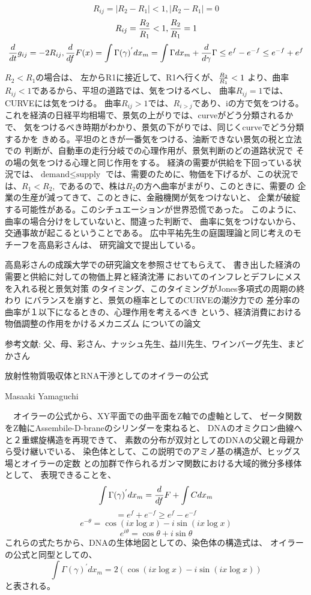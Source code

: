 \documentclass{jsarticle}
\begin{document}
{  $$ R_{ij} = |R_2 - R_1| < 1, |R_2 - R_1| = 0 $$
  $$ R_{ij} = {R_2 \over R_1} < 1, {R_2 \over R_1} = 1 $$
  $$ {d \over dt}g_{ij} = - 2 R_{ij}, {d \over d f} F(x) = 
  \int \Gamma(\gamma)^{'}dx_m = \int \Gamma dx_m + {d \over d \gamma}
  \Gamma \le e^{f} - e^{-f} \le e^{-f} + e^{f} $$

$ R_2 < R_1 \text{の場合は、}$
左からR1に接近して、R1へ行くが、${R_2 \over R_1} < 1 $
より、曲率$R_{ij} < 1$であるから、平坦の道路では、気をつけるべし、
曲率$R_{ij} = 1$では、CURVEには気をつける。
曲率$R_{ij} > 1$では、$R_{i > j}$であり、iの方で気をつける。
これを経済の日経平均相場で、景気の上がりでは、curveがどう分類されるかで、
気をつけるべき時期がわかり、景気の下がりでは、同じくcurveでどう分類するかを
きめる。平坦のときが一番気をつける、油断できない景気の税と立法での
判断が、自動車の走行分岐での心理作用が、景気判断のどの道路状況で
その場の気をつける心理と同じ作用をする。
経済の需要が供給を下回っている状況では、$\text{demand} \le \text{supply}$
では、需要のために、物価を下げるが、この状況では、$ R_1 < R_2, $
であるので、株は$R_2$の方へ曲率がまがり、このときに、需要の
企業の生産が減ってきて、このときに、金融機関が気をつけないと、
企業が破綻する可能性がある。このシチュエーションが世界恐慌であった。
このように、曲率の場合分けをしていないと、間違った判断で、
曲率に気をつけないから、交通事故が起こるということである。
広中平祐先生の庭園理論と同じ考えのモチーフを高島彩さんは、
研究論文で提出している。

   高島彩さんの成蹊大学での研究論文を参照させてもらえて、
書き出した経済の需要と供給に対しての物価上昇と経済沈滞
においてのインフレとデフレにメスを入れる税と景気対策
のタイミング、このタイミングがJones多項式の周期の終わり
にバランスを崩すと、景気の極率としてのCURVEの潮汐力での
差分率の曲率が１以下になるときの、心理作用を考えるべき
という、経済消費における物価調整の作用をかけるメカニズム
についての論文 　

参考文献: 父、母、彩さん、ナッシュ先生、益川先生、ワインバーグ先生、まどかさん


\newpage
\begin{center}
\large	放射性物質吸収体とRNA干渉としてのオイラーの公式
\end{center}
\begin{center}
	Masaaki Yamaguchi
\end{center}

  　オイラーの公式から、XY平面での曲平面をZ軸での虚軸として、
  ゼータ関数をZ軸にAssembile-D-braneのシリンダーを束ねると、
  DNAのオミクロン曲線へと２重螺旋構造を再現できて、
  素数の分布が双対としてのDNAの父親と母親から受け継いでいる、
  染色体として、この説明でのアミノ基の構造が、ヒッグス場とオイラーの定数
  との加群で作られるガンマ関数における大域的微分多様体として、
  表現できることを、
  $$ \int \Gamma(\gamma)^{'}dx_m = {d \over df}F + \int C dx_m $$
  $$ = e^f + e^{-f} \ge e^{f} - e^{-f} $$
  $$ e^{-\theta} = \cos(i x \log x) - i \sin(i x \log x) $$
  $$ e^{i \theta} = \cos \theta + i \sin \theta $$
  これらの式たちから、DNAの生体地図としての、染色体の構造式は、
  オイラーの公式と同型としての、
  $$ \int \Gamma(\gamma)^{'}dx_m  = 2(\cos (i x \log x) - i \sin (i x \log x))$$
  と表される。

}
\end{document}
